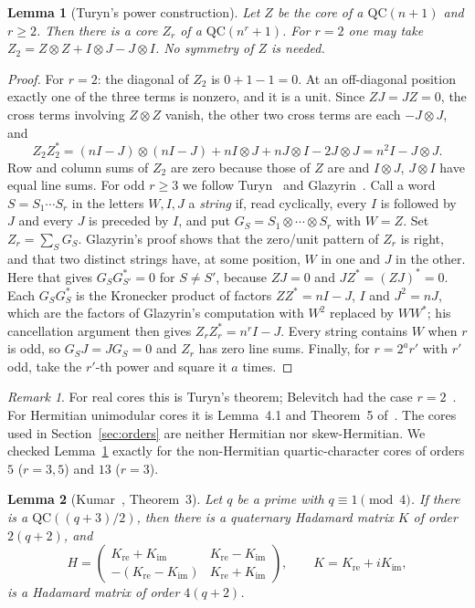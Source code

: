 \documentclass[10pt]{article}
\newtheorem{lemma}{Lemma}
\theoremstyle{remark}
\newtheorem*{remark}{Remark}
\newcommand{\QC}{\mathrm{QC}}
\begin{document}
\begin{lemma}[Turyn's power construction]\label{lem:power}
Let $Z$ be the core of a $\QC(n+1)$ and $r\ge2$. Then there is a core $Z_r$ of a $\QC(n^r+1)$. For $r=2$ one may take $Z_2=Z\otimes Z+I\otimes J-J\otimes I$. No symmetry of $Z$ is needed.
\end{lemma}

\begin{proof}
For $r=2$: the diagonal of $Z_2$ is $0+1-1=0$. At an off-diagonal position exactly one of the three terms is nonzero, and it is a unit. Since $ZJ=JZ=0$, the cross terms involving $Z\otimes Z$ vanish, the other two cross terms are each $-J\otimes J$, and
\[
Z_2Z_2^*=(nI-J)\otimes(nI-J)+nI\otimes J+nJ\otimes I-2J\otimes J=n^2I-J\otimes J .
\]
Row and column sums of $Z_2$ are zero because those of $Z$ are and $I\otimes J$, $J\otimes I$ have equal line sums. For odd $r\ge3$ we follow Turyn~\cite{Tu71} and Glazyrin~\cite[Theorem~5]{Gl26}. Call a word $S=S_1\cdots S_r$ in the letters $W,I,J$ a \emph{string} if, read cyclically, every $I$ is followed by $J$ and every $J$ is preceded by $I$, and put $G_S=S_1\otimes\cdots\otimes S_r$ with $W=Z$. Set $Z_r=\sum_S G_S$. Glazyrin's proof shows that the zero/unit pattern of $Z_r$ is right, and that two distinct strings have, at some position, $W$ in one and $J$ in the other. Here that gives $G_{S}G_{S'}^*=0$ for $S\ne S'$, because $ZJ=0$ and $JZ^*=(ZJ)^*=0$. Each $G_SG_S^*$ is the Kronecker product of factors $ZZ^*=nI-J$, $I$ and $J^2=nJ$, which are the factors of Glazyrin's computation with $W^2$ replaced by $WW^*$; his cancellation argument then gives $Z_rZ_r^*=n^rI-J$. Every string contains $W$ when $r$ is odd, so $G_SJ=JG_S=0$ and $Z_r$ has zero line sums. Finally, for $r=2^ar'$ with $r'$ odd, take the $r'$-th power and square it $a$ times.
\end{proof}

\begin{remark}
For real cores this is Turyn's theorem; Belevitch had the case $r=2$~\cite{GS67}. For Hermitian unimodular cores it is Lemma~4.1 and Theorem~5 of~\cite{Gl26}. The cores used in Section~\ref{sec:orders} are neither Hermitian nor skew-Hermitian. We checked Lemma~\ref{lem:power} exactly for the non-Hermitian quartic-character cores of orders $5$ ($r=3,5$) and $13$ ($r=3$).
\end{remark}

\begin{lemma}[Kumar~\cite{Ku26}, Theorem~3]\label{lem:template}
Let $q$ be a prime with $q\equiv1\pmod4$. If there is a $\QC((q+3)/2)$, then there is a quaternary Hadamard matrix $K$ of order $2(q+2)$, and
\[
H=\begin{pmatrix}K_{\mathrm{re}}+K_{\mathrm{im}}&K_{\mathrm{re}}-K_{\mathrm{im}}\\-(K_{\mathrm{re}}-K_{\mathrm{im}})&K_{\mathrm{re}}+K_{\mathrm{im}}\end{pmatrix},\qquad K=K_{\mathrm{re}}+iK_{\mathrm{im}},
\]
is a Hadamard matrix of order $4(q+2)$.
\end{lemma}
\end{document}
